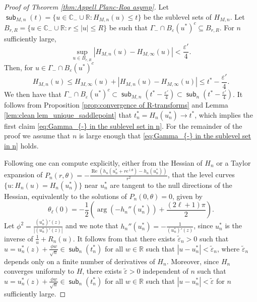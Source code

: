 \documentclass[reqno]{amsart}
\DeclareMathOperator{\sub}{\mathsf{sub}}
\newcommand{\1}{\mathbf{1}}
\DeclareMathOperator{\ii}{i}
\newcommand{\C}{\mathbb{C}}
\renewcommand\Re{\operatorname{Re}}
\newcommand{\eps}{\varepsilon}
\newcommand{\R}{\mathbb{R}}
\def\R{\mathbb{R}}
\theoremstyle{plain}
\theoremstyle{definition}
\theoremstyle{remark}
\numberwithin{equation}{section}
\begin{document}
\begin{proof}[Proof of Theorem \ref{thm:Appell Planc-Roa asymp}]
Let $\sub_{M,n}(t)=\{u\in\C_-\cup\R: H_{M,n}(u)\leq t\}$ be the sublevel sets of $H_{M,n}$. Let $B_{r,R}=\{u\in\C_-\cup\R: r\leq |u|\leq R\}$ be such that $\Gamma_{-}\cap B_{\eps}(u^*)^{c}\subseteq B_{r,R}$. For $n$ sufficiently large,\begin{equation}
	\sup_{u\in B_{r,R}}\left|H_{M,n}(u)-H_{M,\infty }(u) \right|<\frac{\eps'}{4}.
\end{equation} Then, for $u\in\Gamma_{-}\cap B_{\eps}(u^*)^{c}$\begin{equation}
H_{M,n}(u)\leq H_{M,\infty }(u)+\left|H_{M,n}(u)-H_{M,\infty }(u) \right|\leq t^*-\frac{\eps'}{4}.
\end{equation}We then have that $\Gamma_{-}\cap B_{\eps}(u^*)^{c}\subset \sub_{M,n}(t^*-\frac{\eps'}{4})\subset \sub_{n}(t^*-\frac{\eps'}{4})$. It follows from Proposition \ref{prop:convergence of R-transforms} and Lemma \ref{lem:clean lem_unique_saddlepoint} that $t_{n}^*=H_{n}(u_n^*)\to t^*$, which implies the first claim \eqref{eq:Gamma_{-} in the sublevel set in n}. For the remainder of the proof we assume that $n$ is large enough that \eqref{eq:Gamma_{-} in the sublevel set in n} holds.



		
		Following \cite[\S 2]{OSullivan2019} one can compute explicitly, either from the Hessian of $H_n$ or a Taylor expansion of $P_n(r,\theta)=-\frac{\Re(h_n(u_n^*+re^{\ii\theta})-h_{n}(u_n^*) )}{r^2}$, that the level curves $\{u:H_n(u)=H_{n}(u_n^*)\}$ near $u_n^*$ are tangent to the null directions of the Hessian, equivalently to the solutions of $P_n(0,\theta)=0$, given by \begin{equation}
			\theta_{\ell}(0)=-\frac{1}{2}\left(\arg\left(-h_n''(u_n^*)\right)+\frac{(2\ell+1)\pi}{2} \right).
		\end{equation}  Let $\phi^2=\frac{{(u_n^*)'(z)}}{\left| (u_n^*)'(z)\right|}$ and we note that $h_n''(u_n^*)=-\frac{1}{(u_n^*)'(z)}$, since $u_n^*$ is the inverse of $\frac 1 u +R_n(u)$. It follows from \cite[Proposition 2.1]{OSullivan2019} that there exists $\tilde{\eps}_n>0$ such that $u=u_{n}^{*}(z)+\frac{\phi w}{\sqrt{n}}\in\sub_{n}(t_n^*)$ for all $w\in\R$ such that $|u-u_{n}^*|<\tilde\eps_n$, where $\tilde{\eps}_n$ depends only on a finite number of derivatives of $H_n$. Moreover, since $H_{n}$ converges uniformly to $H$, there exists $\tilde{\eps}>0$ independent of $n$ such that $u=u_{n}^{*}(z)+\frac{\phi w}{\sqrt{n}}\in\sub_{n}(t_n^*)$ for all $w\in\R$ such that $|u-u_{n}^*|<\tilde\eps$ for $n$ sufficiently large.
		

\end{proof}
\end{document}
